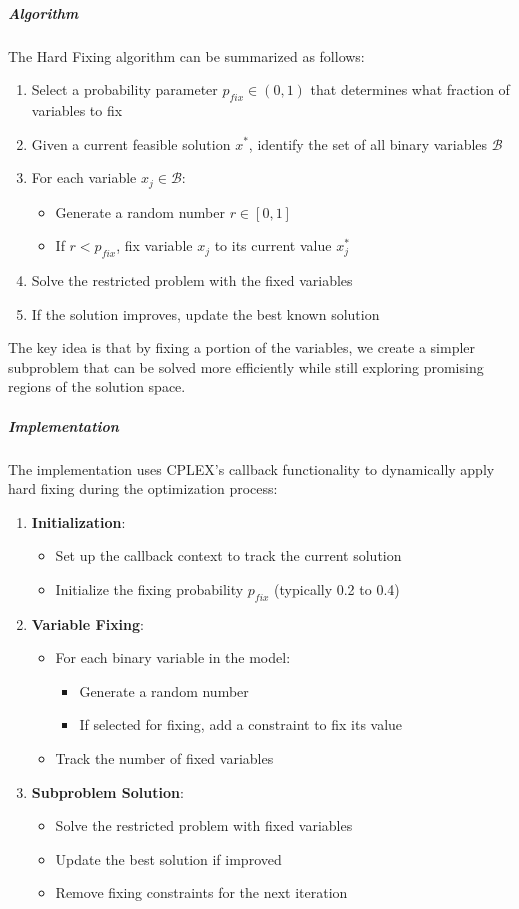 \documentclass{article}
\begin{document}
\subparagraph{Algorithm}
The Hard Fixing algorithm can be summarized as follows: 
\begin{enumerate}
	\item Select a probability parameter $p_{fix} \in (0, 1)$ that determines what fraction of variables to fix
	\item Given a current feasible solution $x^*$, identify the set of all binary variables $\mathcal{B}$
	\item For each variable $x_j \in \mathcal{B}$:
		\begin{itemize}
			\item Generate a random number $r \in [0,1]$
			\item If $r < p_{fix}$, fix variable $x_j$ to its current value $x^*_j$
		\end{itemize}
	\item Solve the restricted problem with the fixed variables
	\item If the solution improves, update the best known solution
\end{enumerate}

The key idea is that by fixing a portion of the variables, we create a simpler subproblem that can be solved more efficiently while still exploring promising regions of the solution space.

\subparagraph{Implementation}
The implementation uses CPLEX's callback functionality to dynamically apply hard fixing during the optimization process:

\begin{enumerate}
	\item \textbf{Initialization}:
		\begin{itemize}
			\item Set up the callback context to track the current solution
			\item Initialize the fixing probability $p_{fix}$ (typically 0.2 to 0.4)
		\end{itemize}
	
	\item \textbf{Variable Fixing}:
		\begin{itemize}
			\item For each binary variable in the model:
				\begin{itemize}
					\item Generate a random number
					\item If selected for fixing, add a constraint to fix its value
				\end{itemize}
			\item Track the number of fixed variables
		\end{itemize}
		
	\item \textbf{Subproblem Solution}:
		\begin{itemize}
			\item Solve the restricted problem with fixed variables
			\item Update the best solution if improved
			\item Remove fixing constraints for the next iteration
		\end{itemize}
\end{enumerate}
\end{document}
